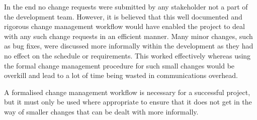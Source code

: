 In the end no change requests were submitted by any stakeholder not a part of the development team.
However, it is believed that this well documented and rigorous change management workflow would
have enabled the project to deal with any such change requests in an efficient manner.
Many minor changes, such as bug fixes, were discussed more informally within the development as
they had no effect on the schedule or requirements. This worked effectively whereas using the
formal change management procedure for such small changes would be overkill and lead to a lot
of time being wasted in communications overhead.


A formalised change management workflow is necessary for a successful project, but it must only
be used where appropriate to ensure that it does not get in the way of smaller changes that
can be dealt with more informally.
